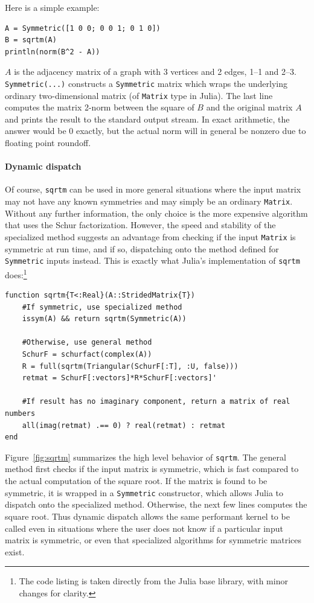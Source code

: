 Here is a simple example:
%
\begin{lstlisting}
A = Symmetric([1 0 0; 0 0 1; 0 1 0])
B = sqrtm(A)
println(norm(B^2 - A))
\end{lstlisting}
%
$A$ is the adjacency matrix of a graph with 3 vertices and 2 edges, 1--1 and
2--3. \lstinline|Symmetric(...)| constructs a \lstinline|Symmetric| matrix
which wraps the underlying ordinary two-dimensional matrix (of
\lstinline|Matrix| type in Julia). The last line computes the matrix 2-norm
between the square of $B$ and the original matrix $A$ and prints the result to
the standard output stream. In exact arithmetic, the answer would be 0 exactly,
but the actual norm will in general be nonzero due to floating point roundoff.

\paragraph{Dynamic dispatch}
Of course, \lstinline|sqrtm| can be used in more general situations where the
input matrix may not have any known symmetries and may simply be an ordinary
\lstinline|Matrix|. Without any further information, the only choice is the
more expensive algorithm that uses the Schur factorization. However, the speed
and stability of the specialized method suggests an advantage from checking if
the input \lstinline|Matrix| is symmetric at run time, and if so, dispatching
onto the method defined for \lstinline|Symmetric| inputs instead. This is
exactly what Julia's implementation of \lstinline|sqrtm| does:\footnote{
The code listing is taken directly from the Julia base library, with minor
changes for clarity.}
%
\begin{lstlisting}
function sqrtm{T<:Real}(A::StridedMatrix{T})
    #If symmetric, use specialized method
    issym(A) && return sqrtm(Symmetric(A))

    #Otherwise, use general method
    SchurF = schurfact(complex(A))
    R = full(sqrtm(Triangular(SchurF[:T], :U, false)))
    retmat = SchurF[:vectors]*R*SchurF[:vectors]'

    #If result has no imaginary component, return a matrix of real numbers
    all(imag(retmat) .== 0) ? real(retmat) : retmat
end
\end{lstlisting}

Figure~\ref{fig:sqrtm} summarizes the high level behavior of \lstinline|sqrtm|.
The general method first checks if the input matrix is symmetric, which is fast
compared to the actual computation of the square root. If the matrix is found to
be symmetric, it is wrapped in a \lstinline|Symmetric| constructor, which allows
Julia to dispatch onto the specialized method. Otherwise, the next few lines
computes the square root. Thus dynamic dispatch allows the same performant
kernel to be called even in situations where the user does not know if a
particular input matrix is symmetric, or even that specialized algorithms for
symmetric matrices exist.

